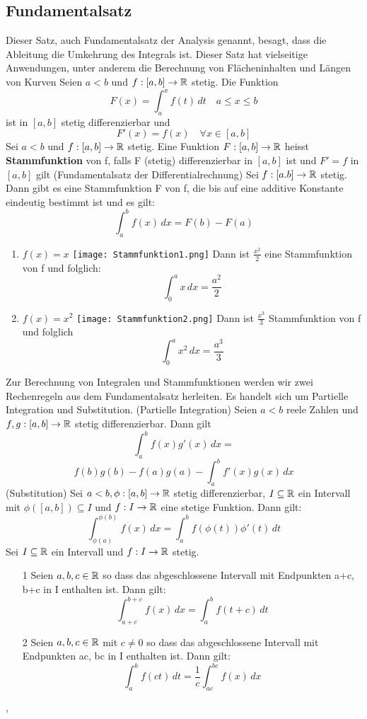 \subsection{Fundamentalsatz}
Dieser Satz, auch Fundamentalsatz der Analysis genannt, besagt, dass die Ableitung die Umkehrung des Integrals ist. Dieser Satz hat vielseitige Anwendungen, unter anderem die Berechnung von Flächeninhalten und Längen von Kurven \newline
\Satz[5.26] Seien \(a < b\) und \(f: [a,b] \rightarrow \mathbb{R} \) stetig. Die Funktion
\[F(x) = \int_{a}^{x} f(t) \,dt \quad a \leq x \leq b\]
ist in \([a,b]\) stetig differenzierbar und
\[ F'(x) = f(x) \quad \forall x \in [a,b]\]
\Def[5.27] Sei \( a < b\) und \(f: [a,b] \rightarrow \mathbb{R}\) stetig. Eine Funktion \(F: [a,b] \rightarrow \mathbb{R}\) heisst \textbf{Stammfunktion} von f, falls F (stetig) differenzierbar in \([a,b]\) ist und \(F'=f\) in \([a,b]\) gilt \newline
\Satz[5.28] (Fundamentalsatz der Differentialrechnung) Sei \(f:[a.b] \rightarrow \mathbb{R} \) stetig. Dann gibt es eine Stammfunktion F von f, die bis auf eine additive Konstante eindeutig bestimmt ist und es gilt: 
\[ \int_{a}^{b} f(x) \,dx = F(b) - F(a)\]
\Bsp[5.29]
\begin{enumerate}
    \item \(f(x) = x\)
    \texttt{[image: Stammfunktion1.png]}
    Dann ist \( \frac{x^2}{2}\) eine Stammfunktion von f und folglich:
    \[ \int_0^a x \,dx = \frac{a^2}{2} \]
    \item \(f(x) = x^2 \)
    \texttt{[image: Stammfunktion2.png]}
    Dann ist \( \frac{x^3}{3}\) Stammfunktion von f und folglich
    \[ \int_{0}^{a} x^2 \,dx = \frac{a^3}{3}\]
\end{enumerate}
Zur Berechnung von Integralen und Stammfunktionen werden wir zwei Rechenregeln aus dem Fundamentalsatz herleiten. Es handelt sich um Partielle Integration und Substitution. \newline
\Satz[5.30](Partielle Integration) Seien \(a < b\) reele Zahlen und \(f,g : [a,b] \rightarrow \mathbb{R} \) stetig differenzierbar. Dann gilt
\[\int_{a}^{b} f(x)g'(x) \,dx = \] 
\[f(b)g(b) - f(a)g(a) - \int_{a}^{b} f'(x)g(x) \,dx\]
\Satz[5.31](Substitution) Sei \(a < b, \phi : [a,b] \rightarrow \mathbb{R} \) stetig differenzierbar, \( I \subseteq \mathbb{R}\) ein Intervall mit \( \phi ([a,b]) \subseteq I \) und \(f: I \rightarrow \mathbb{R} \) eine stetige Funktion. Dann gilt:
\[ \int_{\phi(a)}^{\phi(b)} f(x) \,dx = \int_{a}^{b} f(\phi(t))\phi'(t) \,dt\]
\Korollar[5.33] Sei \( I \subseteq \mathbb{R} \) ein Intervall und \(f: I \rightarrow \mathbb{R}\) stetig.
\begin{enumerate}
    \item [1] Seien \(a,b,c \in \mathbb{R} \) so dass das abgeschlossene Intervall mit Endpunkten a+c, b+c in I enthalten ist. Dann gilt:
    \[ \int_{a+c}^{b+c} f(x) \,dx = \int_{a}^{b} f(t+c) \,dt\]
    \item [2] Seien \(a,b,c \in \mathbb{R} \) mit \( c \neq 0\) so dass das abgeschlossene Intervall mit Endpunkten ac, bc in I enthalten ist. Dann gilt:
    \[\int_{a}^{b} f(ct) \,dt = \frac{1}{c} \int_{ac}^{bc} f(x) \,dx \]
\end{enumerate}
\sep
